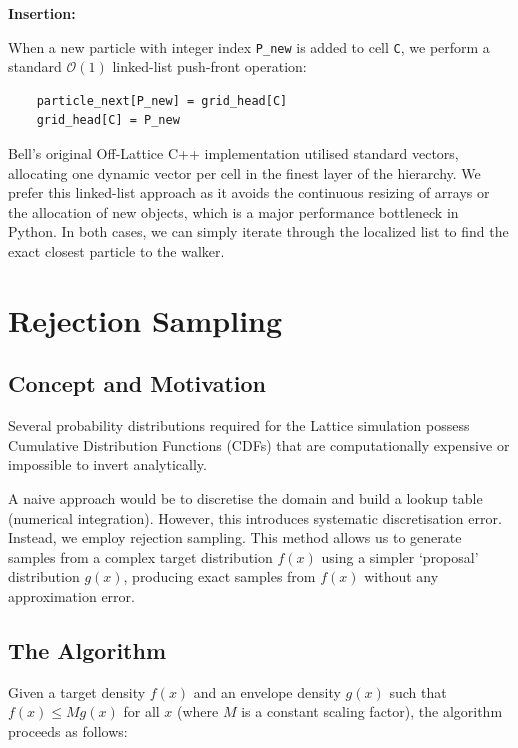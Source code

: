 \documentclass[12pt, a4paper, oneside]{report}
\theoremstyle{remark}
\begin{document}
\noindent \textbf{Insertion:}

When a new particle with integer index \texttt{P\_new} is added to cell \texttt{C}, we perform a standard $\mathcal{O}(1)$ linked-list push-front operation:
\begin{verbatim}
    particle_next[P_new] = grid_head[C]
    grid_head[C] = P_new
\end{verbatim}

Bell's original Off-Lattice C++ implementation utilised standard vectors, allocating one dynamic vector per cell in the finest layer of the hierarchy. We prefer this linked-list approach as it avoids the continuous resizing of arrays or the allocation of new objects, which is a major performance bottleneck in Python. In both cases, we can simply iterate through the localized list to find the exact closest particle to the walker.
\section{Rejection Sampling}
\label{app:rejection_sampling}

\subsection{Concept and Motivation}
Several probability distributions required for the Lattice simulation possess Cumulative Distribution Functions (CDFs) that are computationally expensive or impossible to invert analytically.

A naive approach would be to discretise the domain and build a lookup table (numerical integration). However, this introduces systematic discretisation error. Instead, we employ rejection sampling. This method allows us to generate samples from a complex target distribution $f(x)$ using a simpler `proposal' distribution $g(x)$, producing exact samples from $f(x)$ without any approximation error.

\subsection{The Algorithm}
Given a target density $f(x)$ and an envelope density $g(x)$ such that $f(x) \le M g(x)$ for all $x$ (where $M$ is a constant scaling factor), the algorithm proceeds as follows:

\begin{algorithm}[H]
\caption{Rejection Sampling}
\end{algorithm}
\end{document}
